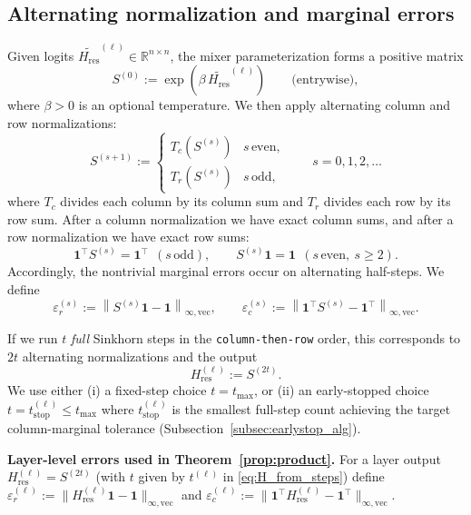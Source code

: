 \documentclass[11pt]{article}
\numberwithin{equation}{section}
\theoremstyle{plain}
\theoremstyle{definition}
\theoremstyle{remark}
\newcommand{\R}{\mathbb{R}}
\newcommand{\ones}{\mathbf{1}}
\newcommand{\norm}[1]{\left\lVert #1 \right\rVert}
\newcommand{\Hres}{H_{\mathrm{res}}}
\newcommand{\tstop}{t_{\mathrm{stop}}}
\newcommand{\tmax}{t_{\max}}
\begin{document}
\subsection{Alternating normalization and marginal errors}\label{subsec:sinkhorn-iter}
Given logits \(\widetilde{\Hres}^{(\ell)}\in\R^{n\times n}\), the mixer parameterization forms a positive matrix
\begin{equation}
S^{(0)}:=\exp(\beta\,\widetilde{\Hres}^{(\ell)}) \qquad \text{(entrywise)},
\end{equation}
where $\beta>0$ is an optional temperature. We then apply alternating column and row normalizations:
\begin{equation}
S^{(s+1)} :=
\begin{cases}
T_c(S^{(s)}) & s \,\text{even},\\
T_r(S^{(s)}) & s \,\text{odd},
\end{cases}
\qquad s=0,1,2,\dots
\end{equation}
where $T_c$ divides each column by its column sum and $T_r$ divides each row by its row sum. After a column
normalization we have exact column sums, and after a row normalization we have exact row sums:
\begin{equation}
\ones^\top S^{(s)}=\ones^\top \ \ (s \,\text{odd}),\qquad
S^{(s)}\ones=\ones \ \ (s \,\text{even},\ s\ge 2).
\end{equation}
Accordingly, the nontrivial marginal errors occur on alternating half-steps. We define
\begin{equation}
\varepsilon_r^{(s)}:=\norm{S^{(s)}\ones-\ones}_{\infty,\mathrm{vec}},\qquad
\varepsilon_c^{(s)}:=\norm{\ones^\top S^{(s)}-\ones^\top}_{\infty,\mathrm{vec}}.
\end{equation}

If we run $t$ \emph{full} Sinkhorn steps in the \texttt{column-then-row} order, this corresponds to $2t$ alternating normalizations and the output
\begin{equation}
\Hres^{(\ell)}:=S^{(2t)}.
\end{equation}
We use either (i) a fixed-step choice $t=\tmax$, or (ii) an early-stopped choice $t=\tstop^{(\ell)}\le \tmax$ where $\tstop^{(\ell)}$
is the smallest full-step count achieving the target column-marginal tolerance (Subsection~\ref{subsec:earlystop_alg}).

\noindent\textbf{Layer-level errors used in Theorem~\ref{prop:product}.}
For a layer output $\Hres^{(\ell)}=S^{(2t)}$ (with $t$ given by $t^{(\ell)}$ in \eqref{eq:H_from_steps}) define
$\varepsilon_r^{(\ell)}:=\|\Hres^{(\ell)}\ones-\ones\|_{\infty,\mathrm{vec}}$ and
$\varepsilon_c^{(\ell)}:=\|\ones^\top \Hres^{(\ell)}-\ones^\top\|_{\infty,\mathrm{vec}}$.
\end{document}
